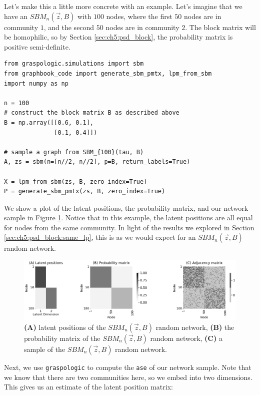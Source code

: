 Let's make this a little more concrete with an example. Let's imagine that we have an $SBM_n(\vec z, B)$ with $100$ nodes, where the first $50$ nodes are in community $1$, and the second $50$ nodes are in community $2$. The block matrix will be homophilic, so by Section \ref{sec:ch5:psd_block}, the probability matrix is positive semi-definite.


\begin{lstlisting}[style=python]
from graspologic.simulations import sbm
from graphbook_code import generate_sbm_pmtx, lpm_from_sbm
import numpy as np

n = 100
# construct the block matrix B as described above
B = np.array([[0.6, 0.1], 
              [0.1, 0.4]])

# sample a graph from SBM_{100}(tau, B)
A, zs = sbm(n=[n//2, n//2], p=B, return_labels=True)

X = lpm_from_sbm(zs, B, zero_index=True)
P = generate_sbm_pmtx(zs, B, zero_index=True)
\end{lstlisting}

We show a plot of the latent positions, the probability matrix, and our network sample in Figure \ref{fig:ch6:ase:ex}. Notice that in this example, the latent positions are all equal for nodes from the same community. In light of the results we explored in Section \ref{sec:ch5:psd_block:same_lp}, this is as we would expect for an $SBM_n(\vec z, B)$ random network.

\begin{figure}
    \centering
    \includegraphics[width=\linewidth]{representations/ch6/Images/ase_sbm_ex.png}
    \caption[$SBM_n(\vec z, B)$ example for ASE]{\textbf{(A)} latent positions of the $SBM_n(\vec z, B)$ random network, \textbf{(B)} the probability matrix of the $SBM_n(\vec z, B)$ random network, \textbf{(C)} a sample of the $SBM_n(\vec z, B)$ random network.}
    \label{fig:ch6:ase:ex}
\end{figure}

Next, we use \texttt{graspologic} to compute the \texttt{ase} of our network sample. Note that we know that there are two communities here, so we embed into two dimensions. This gives us an estimate of the latent position matrix:

